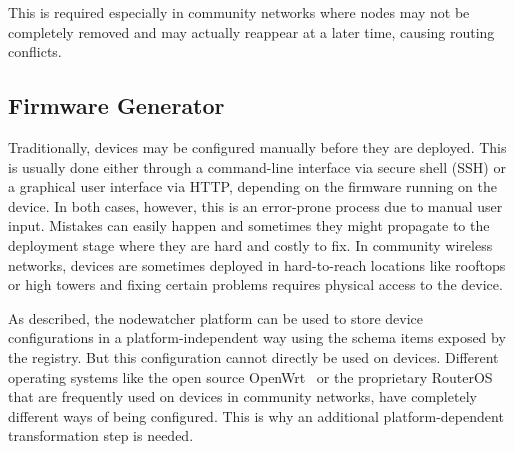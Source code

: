 \documentclass[5p,sort&compress]{elsarticle}
\begin{document}
This is required especially in community networks where nodes may not be completely removed and may actually reappear at a later time, causing routing conflicts.

\subsection{Firmware Generator}
\label{sec:firmware-generator}

Traditionally, devices may be configured manually before they are deployed.
This is usually done either through a command-line interface via secure shell (SSH) or a graphical user interface via HTTP, depending on the firmware running on the device.
In both cases, however, this is an error-prone process due to manual user input.
Mistakes can easily happen and sometimes they might propagate to the deployment stage where they are hard and costly to fix.
In community wireless networks, devices are sometimes deployed in hard-to-reach locations like rooftops or high towers and fixing certain problems requires physical access to the device.

As described, the nodewatcher platform can be used to store device configurations in a platform-independent way using the schema items exposed by the registry.
But this configuration cannot directly be used on devices.
Different operating systems like the open source OpenWrt~\cite{OpenWrt_2004} or the proprietary RouterOS~\cite{RouterOS_1995} that are frequently used on devices in community networks, have completely different ways of being configured.
This is why an additional platform-dependent transformation step is needed.
\end{document}
